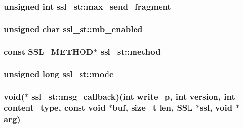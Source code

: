 \hypertarget{structssl__st_a201ff2c24c4a950fc529451563dac099}{
\subsubsection[{max\-\_\-send\-\_\-fragment}]{\setlength{\rightskip}{0pt plus 5cm}unsigned int ssl\-\_\-st\-::max\-\_\-send\-\_\-fragment}}\label{structssl__st_a201ff2c24c4a950fc529451563dac099}
\hypertarget{structssl__st_a7655adab91ac4a50f8bbc94c8b915f04}{
\subsubsection[{mb\-\_\-enabled}]{\setlength{\rightskip}{0pt plus 5cm}unsigned char ssl\-\_\-st\-::mb\-\_\-enabled}}\label{structssl__st_a7655adab91ac4a50f8bbc94c8b915f04}
\hypertarget{structssl__st_a10dff58d99726fe56b47ec037c54802e}{
\subsubsection[{method}]{\setlength{\rightskip}{0pt plus 5cm}const {\bf S\-S\-L\-\_\-\-M\-E\-T\-H\-O\-D}$\ast$ ssl\-\_\-st\-::method}}\label{structssl__st_a10dff58d99726fe56b47ec037c54802e}
\hypertarget{structssl__st_a10add2996a9ac029c3a8a4c19587e1b0}{
\subsubsection[{mode}]{\setlength{\rightskip}{0pt plus 5cm}unsigned long ssl\-\_\-st\-::mode}}\label{structssl__st_a10add2996a9ac029c3a8a4c19587e1b0}
\hypertarget{structssl__st_aae9235fbb945ca49fcc8401a7fc1746f}{
\subsubsection[{msg\-\_\-callback}]{\setlength{\rightskip}{0pt plus 5cm}void($\ast$ ssl\-\_\-st\-::msg\-\_\-callback)(int write\-\_\-p, int {\bf version}, int content\-\_\-type, const void $\ast$buf, size\-\_\-t len, S\-S\-L $\ast$ssl, void $\ast$arg)}}\label{structssl__st_aae9235fbb945ca49fcc8401a7fc1746f}
